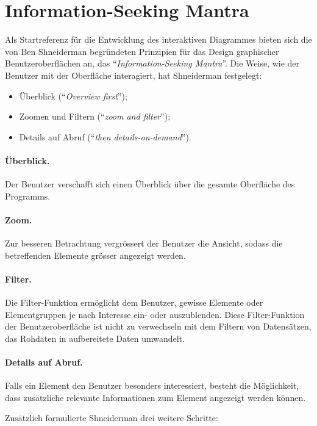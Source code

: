 \section{Information-Seeking Mantra}

Als Startreferenz für die Entwicklung des interaktiven Diagrammes bieten sich die von Ben Shneiderman begründeten Prinzipien für das Design graphischer Benutzeroberflächen an, das "`\textit{Information-Seeking Mantra}"'. Die Weise, wie der Benutzer mit der Oberfläche interagiert, hat Shneiderman \cite{shneiderman} festgelegt:

\begin{itemize}
	\item Überblick ("`\textit{Overview first}"');
	\item Zoomen und Filtern ("`\textit{zoom and filter}"');
	\item Details auf Abruf ("`\textit{then details-on-demand}"').
\end{itemize}

\paragraph{Überblick.} Der Benutzer verschafft sich einen Überblick über die gesamte Oberfläche des Programms.

\paragraph{Zoom.} Zur besseren Betrachtung vergrössert der Benutzer die Ansicht, sodass die betreffenden Elemente grösser angezeigt werden.

\paragraph{Filter.} Die Filter-Funktion ermöglicht dem Benutzer, gewisse Elemente oder Elementgruppen je nach Interesse ein- oder auszublenden. Diese Filter-Funktion der Benutzeroberfläche ist nicht zu verwechseln mit dem Filtern von Datensätzen, das Rohdaten in aufbereitete Daten umwandelt.

\paragraph{Details auf Abruf.} Falls ein Element den Benutzer besonders interessiert, besteht die Möglichkeit, dass zusätzliche relevante Informationen zum Element angezeigt werden können.

\vspace{\baselineskip}
Zusätzlich formulierte Shneiderman drei weitere Schritte:

